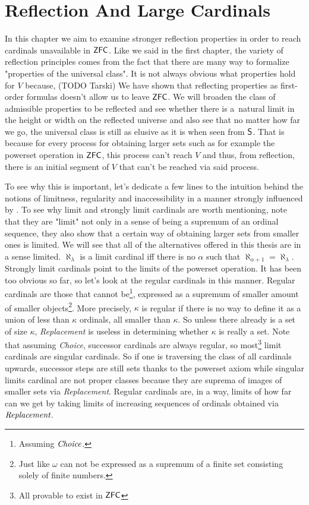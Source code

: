 \section{Reflection And Large Cardinals}

In this chapter we aim to examine stronger reflection properties in order to reach cardinals unavailable in $\sf{ZFC}$. Like we said in the first chapter, %
the variety of reflection principles comes from the fact that there are many way to formalize "properties of the universal class". It is not always obvious what properties hold for $V$ because, (TODO Tarski)
We have shown that reflecting properties as first-order formulas doesn't allow us to leave $\sf{ZFC}$. We will broaden the class of admissible properties to be reflected and see whether there is a~natural limit in the height or width on the reflected universe and also see that no matter how far we go, the universal class is still as elusive as it is when seen from $\sf{S}$. That is because for every process for obtaining larger sets such as for example the powerset operation in $\sf{ZFC}$, this process can't reach $V$ and thus, from reflection, there is an initial segment of $V$ that can't be reached via said process.

To see why this is important, let's dedicate a few lines to the intuition behind the notions of limitness, regularity and inaccessibility in a manner strongly influenced by \cite{Infinity_in_mind}. To see why limit and strongly limit cardinals are worth mentioning, note that they are "limit" not only in a sense of being a supremum of an ordinal sequence, they also show that a certain way of obtaining larger sets from smaller ones is limited. We will see that all of the alternatives offered in this thesis are in a sense limited. 
$\aleph_\lambda$ is a limit cardinal iff there is no $\alpha$ such that $\aleph_{\alpha+1}=\aleph_\lambda$. Strongly limit cardinals point to the limits of the powerset operation. It has been too obvious so far, so let's look at the regular cardinals in this manner. Regular cardinals are those that cannot be\footnote{Assuming $\emph{Choice}$.}, expressed as a supremum of smaller amount of smaller objects\footnote{Just like $\omega$ can not be expressed as a supremum of a finite set consisting solely of finite numbers.}. More precisely, $\kappa$ is regular if there is no way to define it as a union of less than $\kappa$ ordinals, all smaller than $\kappa$. So unless there already is a set of size $\kappa$, \emph{Replacement} is useless in determining whether $\kappa$ is really a set. Note that assuming \emph{Choice}, successor cardinals are always regular, so most\footnote{All provable to exist in $\sf{ZFC}$} limit cardinals are singular cardinals. So if one is traversing the class of all cardinals upwards, successor steps are still sets thanks to the powerset axiom while singular limits cardinal are not proper classes because they are suprema of images of smaller sets via \emph{Replacement}. Regular cardinals are, in a way, limits of how far can we get by taking limits of increasing sequences of ordinals obtained via $\emph{Replacement}$.

